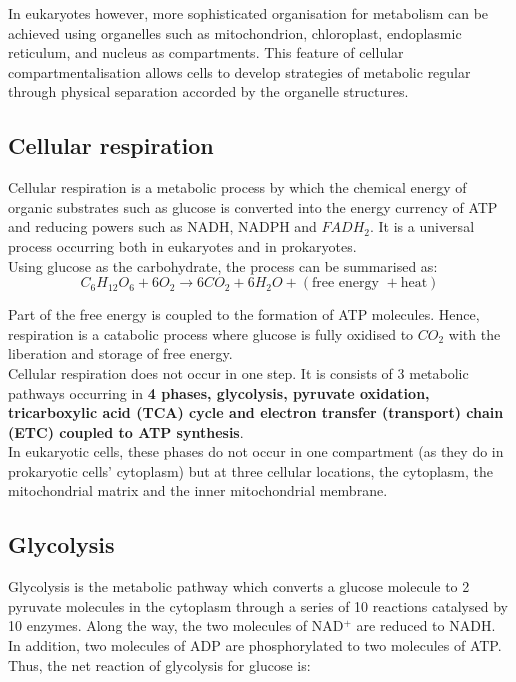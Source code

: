 \documentclass[11pt]{article}
\begin{document}
In eukaryotes however, more sophisticated organisation for metabolism can be achieved using organelles such as mitochondrion, chloroplast, endoplasmic reticulum, and nucleus as compartments. This feature of cellular compartmentalisation allows cells to develop strategies of metabolic regular through physical separation accorded by the organelle structures.

\subsection{Cellular respiration}
\label{sec:orgabc645b}
Cellular respiration is a metabolic process by which the chemical energy of organic substrates such as glucose is converted into the energy currency of ATP and reducing powers such as NADH, NADPH and \(FADH_2\). It is a universal process occurring both in eukaryotes and in prokaryotes.
\\[0pt]

Using glucose as the carbohydrate, the process can be summarised as:
\[C_6 H_{12} O_6 + 6O_2 \rightarrow 6CO_2 + 6H_2O + (\text{free energy } + \text{heat})\]

Part of the free energy is coupled to the formation of ATP molecules. Hence, respiration is a catabolic process where glucose is fully oxidised to \(CO_2\) with the liberation and storage of free energy.
\\[0pt]

Cellular respiration does not occur in one step. It is consists of 3 metabolic pathways occurring in \textbf{4 phases, glycolysis, pyruvate oxidation, tricarboxylic acid (TCA) cycle and electron transfer (transport) chain (ETC) coupled to ATP synthesis}.
\\[0pt]

In eukaryotic cells, these phases do not occur in one compartment (as they do in prokaryotic cells' cytoplasm) but at three cellular locations, the cytoplasm, the mitochondrial matrix and the inner mitochondrial membrane.

\newpage

\subsection{Glycolysis}
\label{sec:org7d1c211}
Glycolysis is the metabolic pathway which converts a glucose molecule to 2 pyruvate molecules in the cytoplasm through a series of 10 reactions catalysed by 10 enzymes. Along the way, the two molecules of NAD\(^+\) are reduced to NADH. In addition, two molecules of ADP are phosphorylated to two molecules of ATP. Thus, the net reaction of glycolysis for glucose is:
\end{document}
